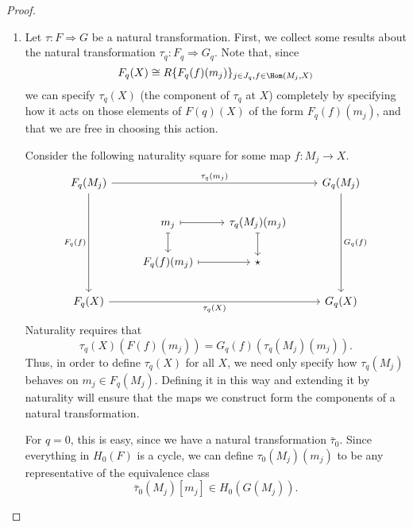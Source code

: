 \documentclass[main.tex]{subfiles}
\begin{document}
\begin{proof}
  \leavevmode
  \begin{enumerate}
    \item Let $\tau\colon F \Rightarrow G$ be a natural transformation. First, we collect some results about the natural transformation $\tau_{q}\colon F_{q} \Rightarrow G_{q}$. Note that, since
      \begin{equation*}
        F_{q}(X) \cong R\{F_{q}(f)(m_{j})\}_{j \in J_{q}, f \in \Hom(M_{j}, X)}
      \end{equation*}
      we can specify $\tau_{q}(X)$ (the component of $\tau_{q}$ at $X$) completely by specifying how it acts on those elements of $F(q)(X)$ of the form $F_{q}(f)(m_{j})$, and that we are free in choosing this action.

      Consider the following naturality square for some map $f\colon M_{j} \to X$.
      \begin{equation*}
        \begin{tikzcd}
          F_{q}(M_{j})
          \arrow[rrr, "\tau_{q}(m_{j})"]
          \arrow[ddd, swap, "F_{q}(f)"]
          &&& G_{q}(M_{j})
          \arrow[ddd, "G_{q}(f)"]
          \\
          & m_{j}
          \arrow[r, mapsto]
          \arrow[d, mapsto]
          & \tau_{q}(M_{j})(m_{j})
          \arrow[d, mapsto]
          \\
          & F_{q}(f)(m_{j})
          \arrow[r, mapsto]
          & \star
          \\
          F_{q}(X)
          \arrow[rrr, swap, "\tau_{q}(X)"]
          &&& G_{q}(X)
        \end{tikzcd}
      \end{equation*}
      Naturality requires that
      \begin{equation*}
        \tau_{q}(X)(F(f)(m_{j})) = G_{q}(f)(\tau_{q}(M_{j})(m_{j})).
      \end{equation*}
      Thus, in order to define $\tau_{q}(X)$ for all $X$, we need only specify how $\tau_{q}(M_{j})$ behaves on $m_{j} \in F_{q}(M_{j})$. Defining it in this way and extending it by naturality will ensure that the maps we construct form the components of a natural transformation.

      For $q = 0$, this is easy, since we have a natural transformation $\bar{\tau}_{0}$. Since everything in $H_{0}(F)$ is a cycle, we can define $\tau_{0}(M_{j})(m_{j})$ to be any representative of the equivalence class
      \begin{equation*}
        \bar{\tau}_{0}(M_{j})[m_{j}] \in H_{0}(G(M_{j})).
      \end{equation*}


\end{enumerate}
\end{proof}
\end{document}
